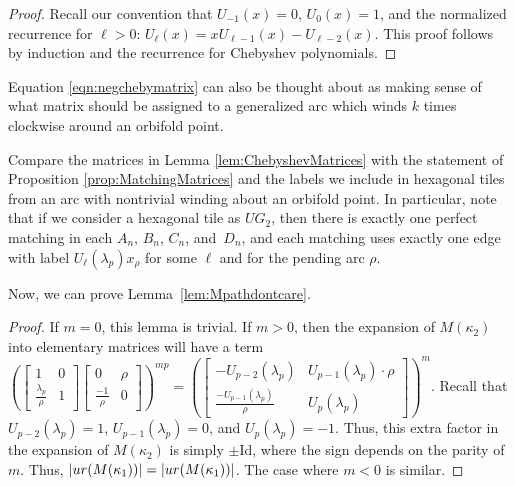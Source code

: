 \documentclass[11pt]{article}
\numberwithin{equation}{section}
\begin{document}
\begin{proof}Recall our convention that $U_{-1}(x) = 0$, $U_0(x) = 1$, and the normalized recurrence for $\ell > 0$: $U_\ell(x) = x U_{\ell-1}(x) - U_{\ell-2}(x)$. This proof follows by induction and the recurrence for Chebyshev polynomials.
\end{proof}

\begin{Remark}Equation \ref{eqn:negchebymatrix} can also be thought about as making sense of what matrix should be assigned to a generalized arc which winds $k$ times clockwise around an orbifold point.
\end{Remark}

\begin{Remark}Compare the matrices in Lemma \ref{lem:ChebyshevMatrices} with the statement of Proposition \ref{prop:MatchingMatrices} and the labels we include in hexagonal tiles from an arc with nontrivial winding about an orbifold point. In particular, note that if we consider a hexagonal tile as $UG_2$, then there is exactly one perfect matching in each $A_n$, $B_n$, $C_n$, and~$D_n$, and each matching uses exactly one edge with label $U_\ell(\lambda_p)x_\rho$ for some $\ell$ and for the pending arc $\rho$.
\end{Remark}

Now, we can prove Lemma~\ref{lem:Mpathdontcare}.

\begin{proof}If $m = 0$, this lemma is trivial. If $m > 0$, then the expansion of $M(\kappa_2)$ into elementary matrices will have a term $\left( \left[\begin{smallmatrix} 1 & 0 \\ \frac{\lambda_p}{\rho} & 1 \end{smallmatrix}\right] \left[\begin{smallmatrix} 0 & \rho \\ \frac{-1}{\rho} & 0 \end{smallmatrix}\right] \right)^{mp} = \left(\left[\begin{smallmatrix} -U_{p-2} (\lambda_p) & U_{p-1}(\lambda_p) \cdot \rho \\ \frac{-U_{p-1}(\lambda_p)}{\rho} & U_p(\lambda_p) \end{smallmatrix}\right]\right)^m $. Recall that $U_{p-2}(\lambda_p) = 1$, $U_{p-1}(\lambda_p) = 0$, and $U_p(\lambda_p) = -1$. Thus, this extra factor in the expansion of $M(\kappa_2)$ is simply $\pm \text{Id}$, where the sign depends on the parity of $m$. Thus, $\vert {\rm ur}(M(\kappa_1)) \vert = \vert {\rm ur}(M(\kappa_1)) \vert$. The case where $m < 0$ is similar.
\end{proof}
\end{document}
